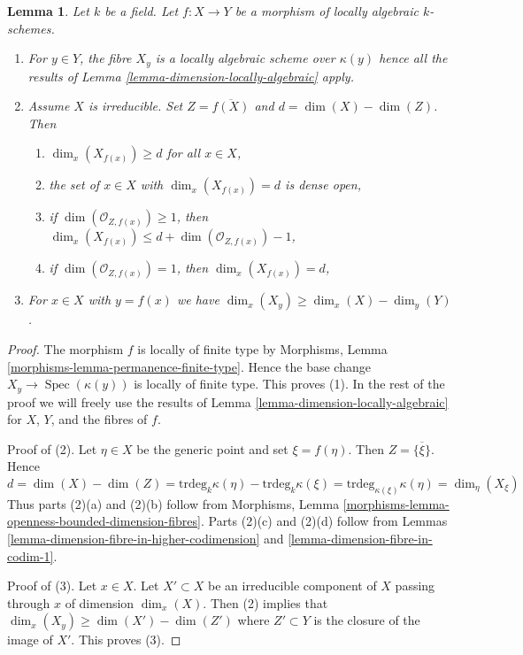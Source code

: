 \documentclass[10pt,a4paper]{amsart}
\theoremstyle{plain}
\newtheorem{lemma}[subsection]{Lemma}
\theoremstyle{definition}
\theoremstyle{remark}
\numberwithin{equation}{subsection}
\def\Spec{\mathop{\mathrm{Spec}}}
\begin{document}
\begin{lemma}
\label{lemma-dimension-fibres-locally-algebraic}
Let $k$ be a field. Let $f : X \to Y$ be a morphism of locally algebraic
$k$-schemes.
\begin{enumerate}
\item For $y \in Y$, the fibre $X_y$ is a locally
algebraic scheme over $\kappa(y)$ hence all the results of
Lemma \ref{lemma-dimension-locally-algebraic} apply.
\item Assume $X$ is irreducible. Set $Z = \overline{f(X)}$ and
$d = \dim(X) - \dim(Z)$. Then
\begin{enumerate}
\item $\dim_x(X_{f(x)}) \geq d$ for all $x \in X$,
\item the set of $x \in X$ with $\dim_x(X_{f(x)}) = d$ is dense open,
\item if $\dim(\mathcal{O}_{Z, f(x)}) \geq 1$, then
$\dim_x(X_{f(x)}) \leq d + \dim(\mathcal{O}_{Z, f(x)}) - 1$,
\item if $\dim(\mathcal{O}_{Z, f(x)}) = 1$, then $\dim_x(X_{f(x)}) = d$,
\end{enumerate}
\item For $x \in X$ with $y = f(x)$ we have
$\dim_x(X_y) \geq \dim_x(X) - \dim_y(Y)$.
\end{enumerate}
\end{lemma}

\begin{proof}
The morphism $f$ is locally of finite type by
Morphisms, Lemma \ref{morphisms-lemma-permanence-finite-type}.
Hence the base change $X_y \to \Spec(\kappa(y))$ is locally
of finite type. This proves (1).
In the rest of the proof we will freely use the results
of Lemma \ref{lemma-dimension-locally-algebraic} for $X$, $Y$, and
the fibres of $f$.

\medskip\noindent
Proof of (2). Let $\eta \in X$ be the generic point and set
$\xi = f(\eta)$. Then $Z = \overline{\{\xi\}}$. Hence
$$
d = \dim(X) - \dim(Z) =
\text{trdeg}_k \kappa(\eta) - \text{trdeg}_k \kappa(\xi) =
\text{trdeg}_{\kappa(\xi)} \kappa(\eta) = \dim_\eta(X_\xi)
$$
Thus parts (2)(a) and (2)(b) follow from
Morphisms, Lemma \ref{morphisms-lemma-openness-bounded-dimension-fibres}.
Parts (2)(c) and (2)(d) follow from
Lemmas \ref{lemma-dimension-fibre-in-higher-codimension} and
\ref{lemma-dimension-fibre-in-codim-1}.

\medskip\noindent
Proof of (3). Let $x \in X$. Let $X' \subset X$ be an irreducible component
of $X$ passing through $x$ of dimension $\dim_x(X)$. Then (2) implies that
$\dim_x(X_y) \geq \dim(X') - \dim(Z')$ where $Z' \subset Y$
is the closure of the image of $X'$. This proves (3).
\end{proof}
\end{document}
